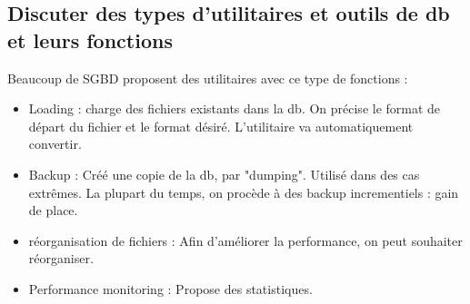 \subsection{Discuter des types d'utilitaires et outils de db et leurs fonctions}
Beaucoup de SGBD proposent des utilitaires avec ce type de fonctions :
\begin{itemize}
	\item Loading : charge des fichiers existants dans la db. On précise le 
	format de départ du fichier et le format désiré. L'utilitaire 
	va automatiquement convertir. 
	\item Backup : Créé une copie de la db, par "dumping". Utilisé dans des 
	cas extrêmes. La plupart du temps, on procède à des backup incrementiels : gain de place.
	\item réorganisation de fichiers : Afin d'améliorer la performance, on peut souhaiter réorganiser.
	\item Performance monitoring : Propose des statistiques.
\end{itemize}
